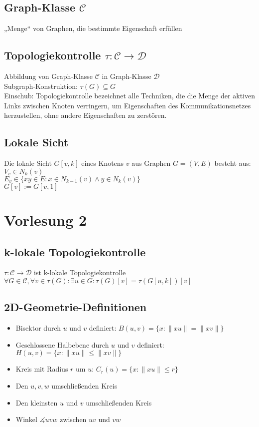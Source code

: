 \documentclass{article}
\begin{document}
\subsection*{Graph-Klasse $\mathcal{C}$}
„Menge“ von Graphen, die bestimmte Eigenschaft erfüllen

\subsection*{Topologiekontrolle $\tau: \mathcal{C} \rightarrow \mathcal{D}$}
Abbildung von Graph-Klasse $\mathcal{C}$ in Graph-Klasse $\mathcal{D}$ \\
Subgraph-Konstruktion: $\tau(G) \subseteq G$
\\Einschub: 
Topologiekontrolle bezeichnet alle Techniken, die die Menge der aktiven Links zwischen Knoten verringern, um Eigenschaften des Kommunikationsnetzes herzustellen, ohne andere Eigenschaften zu zerstören.

\subsection*{Lokale Sicht}
Die lokale Sicht $G[v,k]$ eines Knotens $v$ aus Graphen $G=(V,E)$
besteht aus: \\
$V_v \in N_k(v)$ \\
$E_v \in \{ xy \in E : x \in N_{k-1}(v) \wedge y \in N_k(v) \}$ \\
$G[v] := G[v,1]$

\section{Vorlesung 2}
\subsection*{k-lokale Topologiekontrolle}
$\tau: \mathcal{C} \rightarrow \mathcal{D}$ ist k-lokale
Topologiekontrolle \\
$\forall G \in \mathcal{C}, \forall v \in \tau (G) : \exists u \in G :
\tau (G)[v] = \tau (G[u,k])[v]$

\subsection*{2D-Geometrie-Definitionen}
\begin{itemize}
	\item Bisektor durch $u$ und $v$ definiert: $B(u,v) = \{x : \|xu\| =
	\|xv\|\}$
	\item Geschlossene Halbebene durch $u$ und $v$ definiert: $H(u,v) = \{x:
	\|xu\| \leq \|xv\| \}$
	\item Kreis mit Radius $r$ um $u$: $C_r(u) = \{ x : \|xu\| \leq r \} $
	\item Den $u,v,w$ umschließenden Kreis
	\item Den kleinsten $u$ und $v$ umschließenden Kreis
	\item Winkel $\measuredangle uvw$ zwischen $uv$ und $vw$
\end{itemize}
\end{document}
